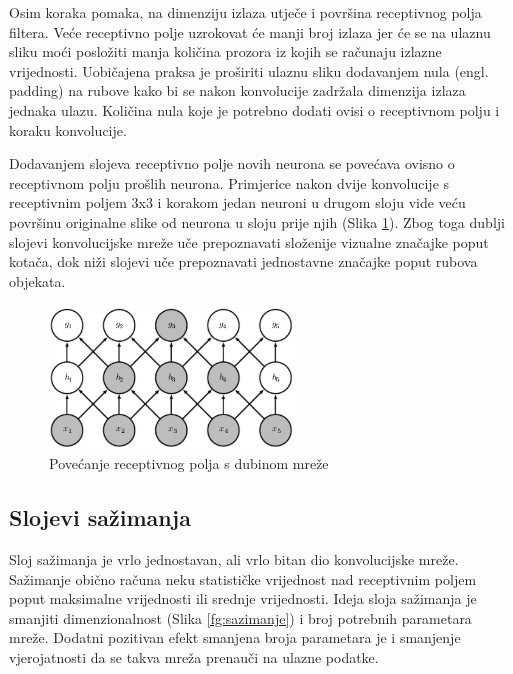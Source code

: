 \documentclass[times, utf8, proizvoljni, numeric]{fer}
\begin{document}
Osim koraka pomaka, na dimenziju izlaza utječe i površina receptivnog polja filtera. Veće receptivno polje uzrokovat će manji broj izlaza jer će se na ulaznu sliku moći posložiti manja količina prozora iz kojih se računaju izlazne vrijednosti. Uobičajena praksa je proširiti ulaznu sliku dodavanjem nula (engl. padding) na rubove kako bi se nakon konvolucije zadržala dimenzija izlaza jednaka ulazu. Količina nula koje je potrebno dodati ovisi o receptivnom polju i koraku konvolucije.

Dodavanjem slojeva receptivno polje novih neurona se povećava ovisno o receptivnom polju prošlih neurona. Primjerice nakon dvije konvolucije s receptivnim poljem 3x3 i korakom jedan neuroni u drugom sloju vide veću površinu originalne slike od neurona u sloju prije njih (Slika \ref{fg:receptivno_polje}). Zbog toga dublji slojevi konvolucijske mreže uče prepoznavati složenije vizualne značajke poput kotača, dok niži slojevi uče prepoznavati jednostavne značajke poput rubova objekata. 

\begin{figure}[!ht]
	\begin{center}
		\captionsetup{justification=centering}
		\includegraphics[width=0.6\textwidth]{./imgs/receptivno_polje.png}
		\caption{Povećanje receptivnog polja s dubinom mreže  \cite{deeplearningbook}}
		\label{fg:receptivno_polje}
	\end{center}
\end{figure}

\subsection{Slojevi sažimanja}

Sloj sažimanja je vrlo jednostavan, ali vrlo bitan dio konvolucijske mreže. Sažimanje obično računa neku statističke vrijednost nad receptivnim poljem poput maksimalne vrijednosti ili srednje vrijednosti. Ideja sloja sažimanja je smanjiti dimenzionalnost (Slika \ref{fg:sazimanje}) i broj potrebnih parametara mreže. Dodatni pozitivan efekt smanjena broja parametara je i smanjenje vjerojatnosti da se takva mreža prenauči na ulazne podatke.
\end{document}
